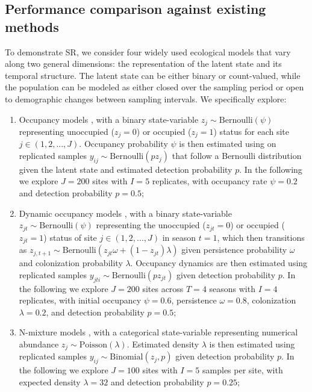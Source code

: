 \documentclass[11pt]{article}
\begin{document}
\subsection{Performance comparison against existing methods} \label{sec:performance_comparison}

To demonstrate SR, we consider four widely used ecological models that vary along two general dimensions: the representation of the latent state and its temporal structure. The latent state can be either binary or count-valued, while the population can be modeled as either closed over the sampling period or open to demographic changes between sampling intervals. We specifically explore:

\begin{enumerate}
    \item Occupancy models \citep{mackenzie_estimating_2002}, with a binary state-variable $z_j \sim \mathrm{Bernoulli}(\psi)$ representing unoccupied ($z_j=0$) or occupied ($z_j=1$) status for each site $j \in \left( 1, 2, ..., J \right)$.  Occupancy probability $\psi$ is then estimated using on replicated samples $y_{ij} \sim \mathrm{Bernoulli}(pz_j)$ that follow a Bernoulli distribution given the latent state and estimated detection probability $p$.  In the following we explore $J=200$ sites with $I=5$ replicates, with occupancy rate $\psi=0.2$ and detection probability $p=0.5$;

    \item Dynamic occupancy models \citep{mackenzie_estimating_2003}, with a binary state-variable $z_{jt} \sim \mathrm{Bernoulli}(\psi)$ representing
    the unoccupied ($z_{jt}=0$) or occupied ($z_{jt}=1$) status of site
    $j \in \left(1, 2, ..., J\right)$ in season $t = 1$, which then
    transitions as $z_{j,t+1} \sim \mathrm{Bernoulli}(z_{jt}\omega +
    (1-z_{jt})\lambda)$ given persistence probability $\omega$ and
    colonization probability $\lambda$.  Occupancy dynamics are then
    estimated using replicated samples $y_{jti} \sim
    \mathrm{Bernoulli}(pz_{jt})$ given detection probability $p$.  In
    the following we explore $J=200$ sites across $T=4$ seasons with
    $I=4$ replicates, with initial occupancy $\psi=0.6$, persistence
    $\omega=0.8$, colonization $\lambda=0.2$, and detection probability
    $p=0.5$;
    
    \item N-mixture models \citep{royle_n-mixture_2004}, with a categorical state-variable representing numerical abundance $z_j \sim \mathrm{Poisson}(\lambda)$.  Estimated density $\lambda$ is then estimated using replicated samples $y_{ij} \sim \mathrm{Binomial}(z_j, p)$ given detection probability $p$.  In the following we explore $J=100$ sites with $I=5$ samples per site, with expected density $\lambda=32$ and detection probability $p=0.25$;


\end{enumerate}
\end{document}
